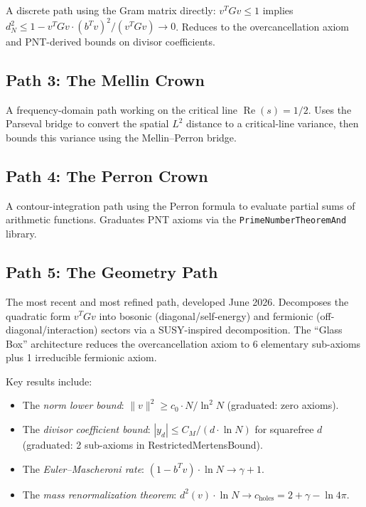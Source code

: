 \documentclass[11pt,a4paper]{article}
\theoremstyle{definition}
\newcommand{\lean}[1]{\texttt{#1}}
\newcommand{\re}{\operatorname{Re}}
\begin{document}
A discrete path using the Gram matrix directly: $v^T G v \leq 1$
implies $d_N^2 \leq 1 - v^T G v \cdot (b^T v)^2 / (v^T G v) \to 0$.
Reduces to the overcancellation axiom and PNT-derived bounds on
divisor coefficients.

\subsection{Path 3: The Mellin Crown}

A frequency-domain path working on the critical line $\re(s) = 1/2$.
Uses the Parseval bridge to convert the spatial $L^2$ distance to a
critical-line variance, then bounds this variance using the
Mellin--Perron bridge.

\subsection{Path 4: The Perron Crown}

A contour-integration path using the Perron formula to evaluate
partial sums of arithmetic functions. Graduates PNT axioms via
the \lean{PrimeNumberTheoremAnd} library.

\subsection{Path 5: The Geometry Path}

The most recent and most refined path, developed June 2026. Decomposes
the quadratic form $v^T G v$ into bosonic (diagonal/self-energy) and
fermionic (off-diagonal/interaction) sectors via a SUSY-inspired
decomposition. The ``Glass Box'' architecture reduces the
overcancellation axiom to 6 elementary sub-axioms plus 1 irreducible
fermionic axiom.

Key results include:
\begin{itemize}
  \item The \emph{norm lower bound}: $\|v\|^2 \geq c_0 \cdot N / \ln^2 N$
    (graduated: zero axioms).
  \item The \emph{divisor coefficient bound}: $|y_d| \leq C_M / (d \cdot \ln N)$
    for squarefree $d$ (graduated: 2 sub-axioms in RestrictedMertensBound).
  \item The \emph{Euler--Mascheroni rate}: $(1 - b^T v) \cdot \ln N \to \gamma + 1$.
  \item The \emph{mass renormalization theorem}: $d^2(v) \cdot \ln N \to
    c_{\text{holes}} = 2 + \gamma - \ln 4\pi$.
\end{itemize}
\end{document}
